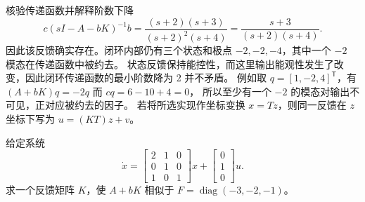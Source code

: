 \documentclass[11pt]{article}
\begin{document}
\begin{solution}
\pagebreak
\begin{proofstep}{核验传递函数并解释阶数下降}
\[
c(sI-A-bK)^{-1}b
=\frac{(s+2)(s+3)}{(s+2)^2(s+4)}
=\frac{s+3}{(s+2)(s+4)}.
\]
因此该反馈确实存在。闭环内部仍有三个状态和极点 $-2,-2,-4$，其中一个 $-2$ 模态在传递函数中被约去。
状态反馈保持能控性，而这里输出能观性发生了改变，因此闭环传递函数的最小阶数降为 2 并不矛盾。
例如取 $q=[1,-2,4]^{\mathsf T}$，有 $(A+bK)q=-2q$ 而 $cq=6-10+4=0$，
所以至少有一个 $-2$ 的模态对输出不可见，正对应被约去的因子。
若将所选实现作坐标变换 $x=Tz$，则同一反馈在 $z$ 坐标下写为 $u=(KT)z+v$。
\end{proofstep}
\end{solution}

\begin{problem}[原题 13]
给定系统
\[
\dot x=\begin{bmatrix}2&1&0\\0&1&0\\1&0&1\end{bmatrix}x+
\begin{bmatrix}0\\1\\0\end{bmatrix}u.
\]
求一个反馈矩阵 $K$，使 $A+bK$ 相似于 $F=\operatorname{diag}(-3,-2,-1)$。
\end{problem}
\end{document}
